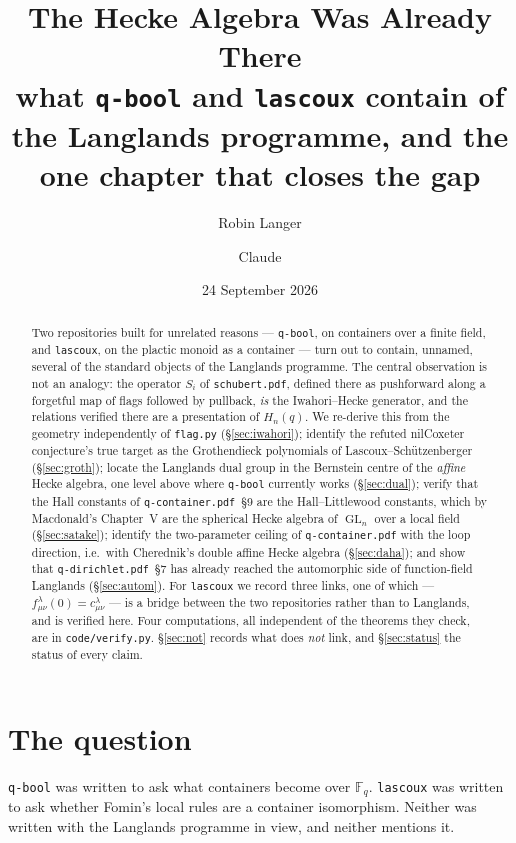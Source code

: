 \documentclass[11pt,a4paper]{article}
\title{\bfseries The Hecke Algebra Was Already There\\[0.4em]
\large what \texttt{q-bool} and \texttt{lascoux} contain of the Langlands
programme, and the one chapter that closes the gap}
\author{Robin Langer \and Claude}
\date{24 September 2026}
\theoremstyle{definition}
\theoremstyle{remark}
\newcommand{\FF}{\mathbb{F}}
\DeclareMathOperator{\GL}{GL}
\begin{document}
\maketitle

\begin{abstract}
Two repositories built for unrelated reasons --- \texttt{q-bool}, on containers
over a finite field, and \texttt{lascoux}, on the plactic monoid as a container
--- turn out to contain, unnamed, several of the standard objects of the
Langlands programme. The central observation is not an analogy: the operator
$S_i$ of \texttt{schubert.pdf}, defined there as pushforward along a forgetful
map of flags followed by pullback, \emph{is} the Iwahori--Hecke generator, and
the relations verified there are a presentation of $H_n(q)$. We re-derive this
from the geometry independently of \texttt{flag.py}
(\S\ref{sec:iwahori}); identify the refuted nilCoxeter conjecture's true target
as the Grothendieck polynomials of Lascoux--Sch\"utzenberger
(\S\ref{sec:groth}); locate the Langlands dual group in the Bernstein centre of
the \emph{affine} Hecke algebra, one level above where \texttt{q-bool}
currently works (\S\ref{sec:dual}); verify that the Hall constants of
\texttt{q-container.pdf}~\S9 are the Hall--Littlewood constants, which by
Macdonald's Chapter~V are the spherical Hecke algebra of $\GL_n$ over a local
field (\S\ref{sec:satake}); identify the two-parameter ceiling of
\texttt{q-container.pdf} with the loop direction, i.e.\ with Cherednik's double
affine Hecke algebra (\S\ref{sec:daha}); and show that
\texttt{q-dirichlet.pdf}~\S7 has already reached the automorphic side of
function-field Langlands (\S\ref{sec:autom}). For \texttt{lascoux} we record
three links, one of which --- $f^{\lambda}_{\mu\nu}(0) = c^{\lambda}_{\mu\nu}$
--- is a bridge between the two repositories rather than to Langlands, and is
verified here. Four computations, all independent of the theorems they check,
are in \texttt{code/verify.py}. \S\ref{sec:not} records what does \emph{not}
link, and \S\ref{sec:status} the status of every claim.
\end{abstract}

\section{The question}

\texttt{q-bool} was written to ask what containers become over $\FF_q$.
\texttt{lascoux} was written to ask whether Fomin's local rules are a container
isomorphism. Neither was written with the Langlands programme in view, and
neither mentions it.
\end{document}
